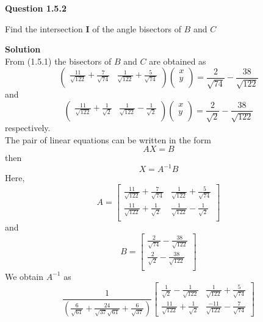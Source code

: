 \documentclass[11pt]{article}
\begin{document}
\textbf{Question 1.5.2}
\begin{flushleft}
Find the intersection \textbf{I} of the angle bisectors of $B$ and $C$
\end{flushleft}

\begin{flushleft}
\textbf{Solution}\\
From (1.5.1) the bisectors of $B$ and $C$ are obtained as 
\[
\begin{pmatrix}
\frac{11}{\sqrt{122}}+\frac{7}{\sqrt{74}} & \frac{1}{\sqrt{122}}+\frac{5}{\sqrt{74}}\\
\end{pmatrix}
\begin{pmatrix}
x\\
y\\
\end{pmatrix}
=\frac{2}{\sqrt{74}}-\frac{38}{\sqrt{122}}
\]
and
\[
\begin{pmatrix}
\frac{11}{\sqrt{122}}+\frac{1}{\sqrt{2}} & \frac{1}{\sqrt{122}}-\frac{1}{\sqrt{2}}\\
\end{pmatrix}
\begin{pmatrix}
x\\
y\\
\end{pmatrix}
=\frac{2}{\sqrt{2}}-\frac{38}{\sqrt{122}}
\]
respectively.\\
\onehalfspacing
The pair of linear equations can be written in the form 
\[AX=B\]
then
\[X=A^{-1}B\]
Here,
\[
A=\begin{bmatrix}
\frac{11}{\sqrt{122}}+\frac{7}{\sqrt{74}} & \frac{1}{\sqrt{122}}+\frac{5}{\sqrt{74}}\\
\frac{11}{\sqrt{122}}+\frac{1}{\sqrt{2}} & \frac{1}{\sqrt{122}}-\frac{1}{\sqrt{2}}\\
\end{bmatrix}
\]
and 
\[
B=\begin{bmatrix}
\frac{2}{\sqrt{74}}-\frac{38}{\sqrt{122}}\\
\frac{2}{\sqrt{2}}-\frac{38}{\sqrt{122}}\\
\end{bmatrix}
\]
We obtain $A^{-1}$ as
\[
\frac{1}{(\frac{6}{\sqrt{61}}+\frac{24}{\sqrt{37}\sqrt{61}}+\frac{6}{\sqrt{37}})}
\begin{bmatrix}
\frac{1}{\sqrt{2}}-\frac{1}{\sqrt{122}} & \frac{1}{\sqrt{122}}+\frac{5}{\sqrt{74}}\\
\frac{11}{\sqrt{122}}+\frac{1}{\sqrt{2}} & \frac{-11}{\sqrt{122}}-\frac{7}{\sqrt{74}}
\end{bmatrix}
\]
\end{flushleft}
\end{document}
